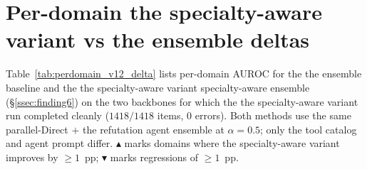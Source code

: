 \section{Per-domain the specialty-aware variant vs  the ensemble deltas}
\label{app:perdomain_v12}

Table~\ref{tab:perdomain_v12_delta} lists per-domain AUROC for the  the ensemble
baseline and the the specialty-aware variant specialty-aware ensemble (\S\ref{ssec:finding6}) on
the two backbones for which the the specialty-aware variant run completed cleanly ($1418/1418$
items, $0$ errors). Both methods use the same parallel-Direct $+$ the refutation agent
ensemble at $\alpha{=}0.5$; only the tool catalog and agent prompt
differ. $\blacktriangle$ marks domains where the specialty-aware variant improves by $\geq 1$~pp;
$\blacktriangledown$ marks regressions of $\geq 1$~pp.

